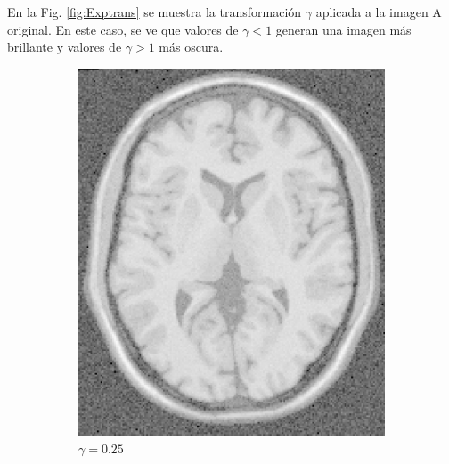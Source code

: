 \documentclass[letterpaper,12pt]{article}
\theoremstyle{plain}
\begin{document}
En la Fig. \ref{fig:Exptrans} se muestra la transformación $\gamma$ aplicada a la imagen A original. En este caso, se ve que valores de $\gamma < 1$ generan una imagen más brillante y valores de $\gamma > 1 $ más oscura.

\begin{figure}[H]
    \centering
         \begin{subfigure}[h]{0.2\textwidth}
            \centering
            \includegraphics[width=\textwidth]{Figuras/ImageA_exp_gamma=0.25.png}
            \caption{$\gamma = 0.25$} 
         \end{subfigure}
         \begin{subfigure}[h]{0.2\textwidth}
            \centering

\end{subfigure}
\end{figure}
\end{document}
